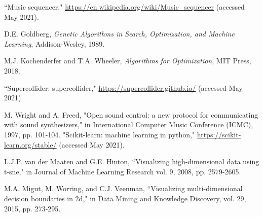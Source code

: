 \documentclass[conference]{IEEEtran}
\begin{document}
\begin{thebibliography}{00}

     ``Music sequencer," \url{https://en.wikipedia.org/wiki/Music_sequencer} (accessed May 2021).

     D.E. Goldberg, \textit{Genetic Algorithms in Search, Optimization, and Machine Learning}, Addison-Wesley,
    1989.

     M.J. Kochenderfer and T.A. Wheeler,
    \textit{Algorithms for Optimization}, MIT Press, 2018.

     ``Supercollider: supercollider,"
    \url{https://supercollider.github.io/} (accessed May 2021).

     M. Wright and A. Freed, "Open sound control: a new
    protocol for communicating with sound synthesizers," in International Computer
    Music Conference (ICMC), 1997, pp. 101-104. 
    "Scikit-learn: machine learning in python," \url{https://scikit-learn.org/stable/} (accessed May 2021).

     L.J.P. van der Maaten and G.E. Hinton, ``Visualizing
    high-dimensional data using t-sne," in Journal of Machine Learning Research
    vol. 9, 2008, pp. 2579-2605.

     M.A. Migut, M. Worring, and C.J. Veenman, ``Visualizing
    multi-dimensional decision boundaries in 2d," in Data Mining and Knowledge
    Discovery, vol. 29, 2015, pp. 273-295.


\end{thebibliography}
\end{document}
